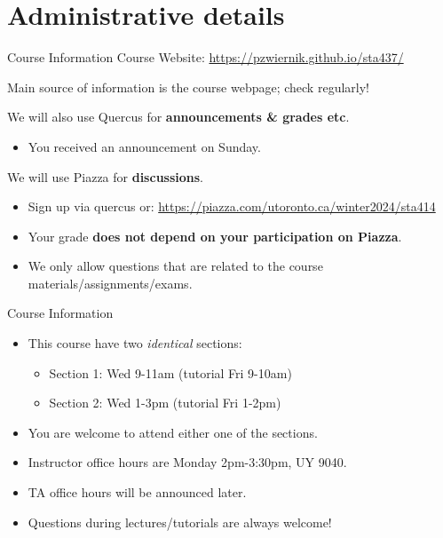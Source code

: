 \documentclass[11pt,handout,aspectratio=169]{beamer}
\begin{document}
\section{Administrative details}
\begin{frame}{Course Information}
Course Website: \url{https://pzwiernik.github.io/sta437/} 

\vspace{.5em}
Main source of information is the course webpage; check regularly!


We will also use \alert{Quercus} for {\bf announcements \& grades  etc}.

\begin{itemize}
\item You received an announcement on Sunday.
\end{itemize}
We will use \alert{Piazza} for {\bf discussions}.
\begin{itemize}
\item Sign up via quercus or: \url{https://piazza.com/utoronto.ca/winter2024/sta414}
\item Your grade {\bf does not depend on your participation on Piazza}. 
\item We only allow questions that are related to the course materials/assignments/exams. 
\end{itemize}
\end{frame}



\begin{frame}{Course Information}
\begin{itemize}
\item This course have two \emph{identical} sections:
  \begin{itemize}
  \item Section 1: Wed 9-11am (tutorial Fri 9-10am)  
  \item Section 2: Wed 1-3pm (tutorial Fri 1-2pm)  
  \end{itemize}
\item You are welcome to attend either one of the sections.
\item Instructor office hours are Monday 2pm-3:30pm, UY 9040.
\item TA office hours will be announced later.
\item Questions during lectures/tutorials are always welcome!
\end{itemize}
\end{frame}
\end{document}
